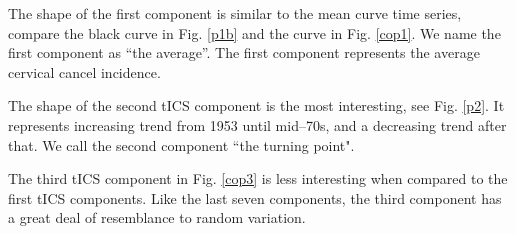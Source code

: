 \documentclass{llncs}
\begin{document}
 
\begin{figure}
     \centering
     \caption{}
     \label{tcomp}
\end{figure}

 
The shape of the first component is similar to the mean curve time series, compare the black curve  in Fig. \ref{p1b} and the curve in Fig. \ref{cop1}. We name the first component as  ``the average''. The first component represents the average cervical cancel incidence.

The shape of the second tICS component is the most interesting, see Fig. \ref{p2}. It represents increasing trend from 1953 until mid--70s, and a decreasing trend after that. We call the second component ``the turning point". 

The third tICS component in Fig. \ref{cop3} is less interesting when compared to the first  tICS components. Like the last seven components, the third component  has a great deal of resemblance to random variation.
\end{document}
